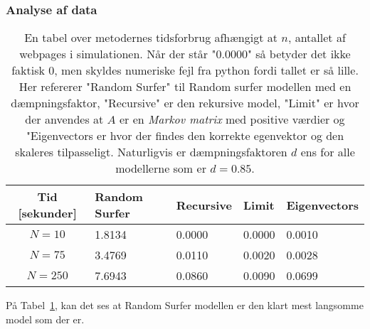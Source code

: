 \subsubsection*{Analyse af data}
\begin{table}[!h]
    \centering
    \begin{tabular}{c|l|l|l|l}
        Tid [sekunder] & Random Surfer & Recursive & Limit & Eigenvectors \\
        \hline
        $N = 10$       & 1.8134   & 0.0000   & 0.0000   & 0.0010   \\
        $N = 75$       & 3.4769   & 0.0110   & 0.0020   & 0.0028   \\
        $N = 250$      & 7.6943   & 0.0860   & 0.0090   & 0.0699
    \end{tabular}
    \caption{En tabel over metodernes tidsforbrug afhængigt at $n$, antallet af webpages i simulationen. Når der står "0.0000" så betyder det ikke faktisk 0, men skyldes numeriske fejl fra python fordi tallet er så lille. Her refererer "Random Surfer" til Random surfer modellen med en dæmpningsfaktor, "Recursive" er den rekursive model, "Limit" er hvor der anvendes at $A$ er en \textit{Markov matrix} med positive værdier og "Eigenvectors er hvor der findes den korrekte egenvektor og den skaleres tilpasseligt. Naturligvis er dæmpningsfaktoren $d$ ens for alle modellerne som er $d = 0.85$.}
    \label{tidsFigur}
\end{table}

På Tabel~\ref{tidsFigur}, kan det ses at Random Surfer modellen er den klart mest langsomme model som der er.
